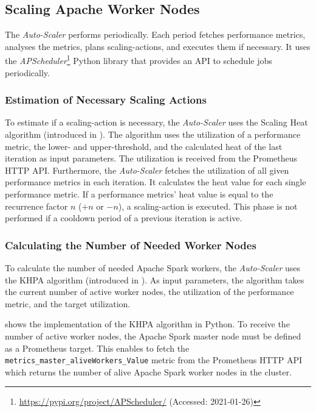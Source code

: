 \subsection{Scaling Apache Worker Nodes}
The \textit{Auto-Scaler} performs periodically. Each period fetches performance metrics, analyses the metrics, plans scaling-actions, and executes them if necessary.
It uses the \textit{APScheduler}\footnote{\url{https://pypi.org/project/APScheduler/} (Accessed: 2021-01-26)} Python library that provides an API to schedule jobs periodically.


\subsubsection{Estimation of Necessary Scaling Actions}
To estimate if a scaling-action is necessary, the \textit{Auto-Scaler} uses the Scaling Heat algorithm (introduced in ).
The algorithm uses the utilization of a performance metric, the lower- and upper-threshold, and the calculated heat of the last iteration as input parameters.
The utilization is received from the Prometheus HTTP API. Furthermore, the \textit{Auto-Scaler} fetches the utilization of all given performance metrics in each iteration. It calculates the heat value for each single performance metric.
If a performance metrics' heat value is equal to the recurrence factor $n$ ($+n$ or $-n$), a scaling-action is executed.
This phase is not performed if a cooldown period of a previous iteration is active.


\subsubsection{Calculating the Number of Needed Worker Nodes}
To calculate the number of needed Apache Spark workers, the \textit{Auto-Scaler} uses the KHPA algorithm (introduced in ).
As input parameters, the algorithm takes the current number of active worker nodes, the utilization of the performance metric, and the target utilization.


 shows the implementation of the KHPA algorithm in Python.
To receive the number of active worker nodes, the Apache Spark master node must be defined as a Prometheus target. This enables to fetch the \texttt{metrics\_master\_aliveWorkers\_Value} metric from the Prometheus HTTP API which returns the number of alive Apache Spark worker nodes in the cluster.

